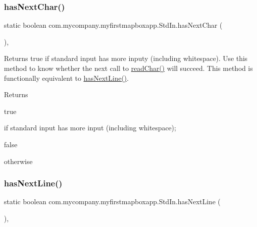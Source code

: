 \subsubsection{\texorpdfstring{has\+Next\+Char()}{hasNextChar()}}
{\footnotesize\ttfamily static boolean com.\+mycompany.\+myfirstmapboxapp.\+Std\+In.\+has\+Next\+Char (\begin{DoxyParamCaption}{ }\end{DoxyParamCaption})\hspace{0.3cm}{\ttfamily [inline]}, {\ttfamily [static]}}

Returns true if standard input has more inputy (including whitespace). Use this method to know whether the next call to \hyperlink{classcom_1_1mycompany_1_1myfirstmapboxapp_1_1_std_in_ab6468a980b4dba835a5168734d16ef31}{read\+Char()} will succeed. This method is functionally equivalent to \hyperlink{classcom_1_1mycompany_1_1myfirstmapboxapp_1_1_std_in_ace5ddf1a9d8a3aacb85be47296327502}{has\+Next\+Line()}.

\begin{DoxyReturn}{Returns}

\begin{DoxyCode}
\textcolor{keyword}{true} 
\end{DoxyCode}
 if standard input has more input (including whitespace); 
\begin{DoxyCode}
\textcolor{keyword}{false} 
\end{DoxyCode}
 otherwise 
\end{DoxyReturn}
\mbox{\label{classcom_1_1mycompany_1_1myfirstmapboxapp_1_1_std_in_ace5ddf1a9d8a3aacb85be47296327502}} 
\subsubsection{\texorpdfstring{has\+Next\+Line()}{hasNextLine()}}
{\footnotesize\ttfamily static boolean com.\+mycompany.\+myfirstmapboxapp.\+Std\+In.\+has\+Next\+Line (\begin{DoxyParamCaption}{ }\end{DoxyParamCaption})\hspace{0.3cm}{\ttfamily [inline]}, {\ttfamily [static]}}

